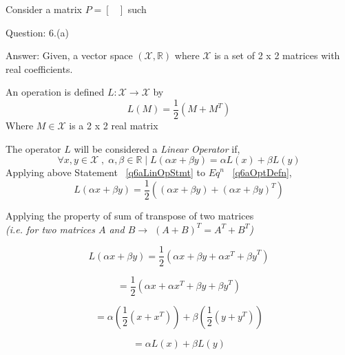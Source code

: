 \documentclass[a4paper]{article}
\begin{document}
\begin{qalist}
			Consider a matrix $P = \begin{bmatrix}\end{bmatrix}$ such 
			
		\item[Question: 6.(a)] \setcounter{equation}{0} 
		\item[Answer:] Given, a vector space $(\mathcal{X}, \mathbb{R})$ where $\mathcal{X}$ is a set of 2 x 2 matrices with real coefficients.
		
		An operation is defined $L : \mathcal{X} \rightarrow \mathcal{X}$ by 
		\begin{equation}\label{q6aOptDefn}
			L(M) = \frac{1}{2} (M + {M}^{T})
		\end{equation}
		Where $M \in \mathcal{X}$ is a 2 x 2 real matrix
		
		The operator $L$ will be considered a \textit{Linear Operator} if, 
		\begin{equation}\label{q6aLinOpStmt}
			\forall x,y \in \mathcal{X} \;,\; \alpha, \beta \in \mathbb{R}\;|\;L(\alpha x + \beta y) = \alpha L(x) + \beta L(y)
		\end{equation}
		Applying above Statement ~\ref{q6aLinOpStmt} to ${Eq}^{n}$ ~\ref{q6aOptDefn},
		\begin{equation}\label{q6aPrfStart}
			L(\alpha x + \beta y) = \frac{1}{2}((\alpha x + \beta y) + {(\alpha x + \beta y)}^{T})
		\end{equation}
		
		Applying the property of sum of transpose of two matrices \\ \textit{(i.e. for two matrices $A$ and $B \rightarrow$ ${(A+B)}^{T} = {A}^{T} + {B}^{T}$)}
		
		\begin{equation}\label{q6aPrfTranspose}
			L(\alpha x + \beta y) = \frac{1}{2}(\alpha x + \beta y + {\alpha x}^{T} + {\beta y}^{T})
		\end{equation}
		
		\begin{equation}\label{q6aPrfRearrange}
			= \frac{1}{2}(\alpha x + {\alpha x}^{T} + \beta y  + {\beta y}^{T})
		\end{equation}
		
		\begin{equation}\label{q6aPrfTakingCommon}
			= \alpha (\frac{1}{2}(x + {x}^{T})) + \beta(\frac{1}{2}(y  + {y}^{T}))
		\end{equation}
		
		\begin{equation}\label{q6aPrfBackSubn}
			= \alpha L(x) + \beta L(y)
		\end{equation}
		

\end{qalist}
\end{document}
